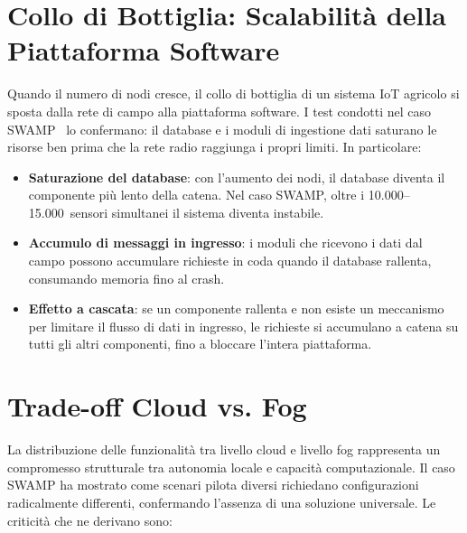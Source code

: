 \section{Collo di Bottiglia: Scalabilità della Piattaforma Software}

Quando il numero di nodi cresce, il collo di bottiglia di un sistema IoT agricolo si sposta dalla rete di campo alla piattaforma software. I test condotti nel caso SWAMP~\cite{kamienski2019swamp} lo confermano: il database e i moduli di ingestione dati saturano le risorse ben prima che la rete radio raggiunga i propri limiti. In particolare:

\begin{itemize}
	\item \textbf{Saturazione del database}: con l'aumento dei nodi, il database diventa il componente più lento della catena. Nel caso SWAMP, oltre i 10.000--15.000~sensori simultanei il sistema diventa instabile.
	
	\item \textbf{Accumulo di messaggi in ingresso}: i moduli che ricevono i dati dal campo possono accumulare richieste in coda quando il database rallenta, consumando memoria fino al crash.
	
	\item \textbf{Effetto a cascata}: se un componente rallenta e non esiste un meccanismo per limitare il flusso di dati in ingresso, le richieste si accumulano a catena su tutti gli altri componenti, fino a bloccare l'intera piattaforma.
\end{itemize}




\section{Trade-off Cloud vs. Fog}

La distribuzione delle funzionalità tra livello cloud e livello fog rappresenta un compromesso strutturale tra autonomia locale e capacità computazionale. Il caso SWAMP ha mostrato come scenari pilota diversi richiedano configurazioni radicalmente differenti, confermando l'assenza di una soluzione universale. Le criticità che ne derivano sono:

